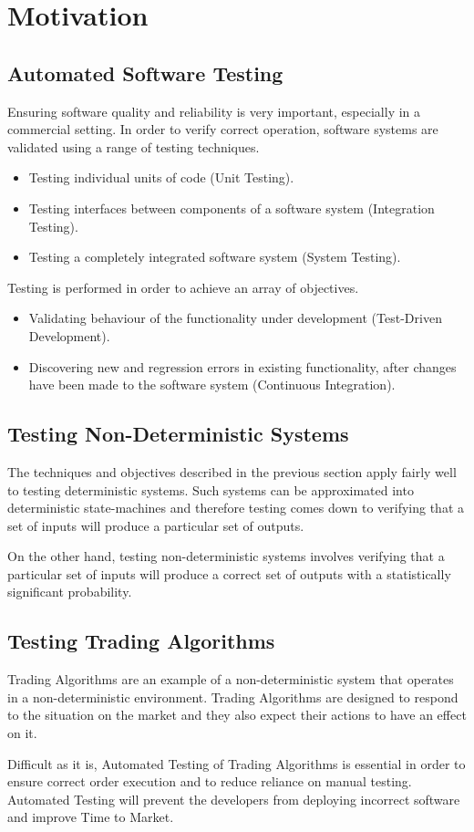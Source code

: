 \section{Motivation}

\subsection{Automated Software Testing}
Ensuring software quality and reliability is very important, especially in a commercial setting. In order to verify correct operation, software systems are validated using a range of testing techniques. 

\begin{itemize}
\item Testing individual units of code (Unit Testing).
\item Testing interfaces between components of a software system (Integration Testing). 
\item Testing a completely integrated software system (System Testing).
\end{itemize}

\noindent
Testing is performed in order to achieve an array of objectives.
\begin{itemize}
\item Validating behaviour of the functionality under development (Test-Driven Development). 
\item Discovering new and regression errors in existing functionality, after changes have been made to the software system (Continuous Integration).
\end{itemize}

\subsection{Testing Non-Deterministic Systems}
The techniques and objectives described in the previous section apply fairly well to testing deterministic systems. Such systems can be approximated into deterministic state-machines and therefore testing comes down to verifying that a set of inputs will produce a particular set of outputs.

On the other hand, testing non-deterministic systems involves verifying that a particular set of inputs will produce a correct set of outputs with a statistically significant probability.

\subsection{Testing Trading Algorithms}
Trading Algorithms are an example of a non-deterministic system that operates in a non-deterministic environment. Trading Algorithms are designed to respond to the situation on the market and they also expect their actions to have an effect on it.

Difficult as it is, Automated Testing of Trading Algorithms is essential in order to ensure correct order execution and to reduce reliance on manual testing. Automated Testing will prevent the developers from deploying incorrect software and improve Time to Market.

